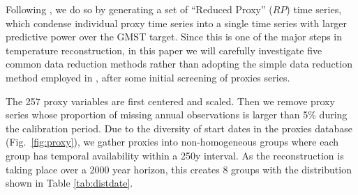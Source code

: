\documentclass[12pt]{amsart}
\theoremstyle{plain}
\theoremstyle{definition}
\theoremstyle{remark}
\newcommand{\lb}[1]{\color{MidnightBlue}\textbf{[LB: #1]}\normalcolor}
\newcommand{\jeg}[1]{\color{ProcessBlue}\textbf{[JEG: #1]}\normalcolor}
\begin{document}
Following \cite{Barboza2014}, we do so by generating a set of ``Reduced Proxy'' ($RP$) time series, which condense individual proxy time series into a single time series with larger predictive power over the GMST target. Since this is one of the major steps in temperature reconstruction, in this paper we will carefully investigate five common data reduction methods rather than adopting the simple data reduction method employed in \cite{Barboza2014}, after some initial screening of proxies series.    

The 257 proxy variables are first centered and scaled. Then we remove
proxy series whose proportion of missing annual observations is larger than 5\%
during the calibration  period.  %
Due to the diversity of start dates in the proxies database (Fig.~\ref{fig:proxy}), we gather proxies into non-homogeneous groups where each group has temporal availability within a 250y interval. As the reconstruction is taking place over a 2000 year
horizon, this creates 8 groups with the distribution shown in Table \ref{tab:distdate}. 
\end{document}
